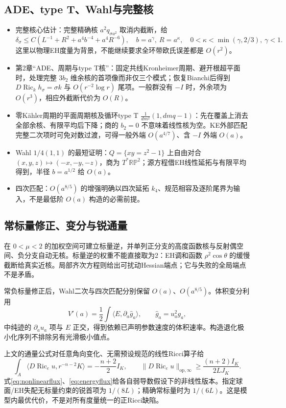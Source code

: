 \documentclass[UTF8,a4paper,11pt,fontset=fandol]{ctexart}
\numberwithin{equation}{section}
\theoremstyle{definition}
\newcommand{\Ric}{\operatorname{Ric}}
\newcommand{\op}{\mathrm{op}}
\begin{document}
\subsection{ADE、type T、Wahl与完整核}
\begin{itemize}
\item 完整核心估计：完整精确核 $a^2q_{\sigma a^2}$ 取消内截断，给
\[
\delta_\sigma\le C(L^{-1}+R^2+a^4b^{-4}+a^4R^{-6}),
\quad b=a^\gamma,\ R=a^\kappa,
\quad0<\kappa<\min(\gamma,2/3),\ \gamma<1.
\]
这里以物理EH度量为背景，不能继续要求全环带欧氏误差都是 $O(r^2)$。
\item 第2章“ADE、周期与type T核”：固定共线Kronheimer周期、避开根超平面时，处理完整 $3b_2$ 维余核的首项像而非仅三个模式；恢复Bianchi后得到 $D\Ric_kh_\sigma=\sigma k$ 与 $O(r^{-2}\log r)$ 尾项。一般群没有 $-I$ 时，外余项为 $O(r^3)$，相应外截断代价为 $O(R)$。
\item 零K\"ahler周期的平面周期核及循环type T
$\frac1{dm^2}(1,dmq-1)$：先在覆盖上消去全部余核、有限平均后下降；商的 $b_2=0$ 不意味着线性核为空。KE外部匹配完整二次项时可免对数过渡，可得一般外端 $O(a^{4/7})$、含 $-I$ 外端 $O(a)$。
\item Wahl $1/4(1,1)$ 的最短证明：$Q=\{xy=z^2-1\}$ 上自由对合 $(x,y,z)\mapsto(-x,-y,-z)$，商为 $T^*\mathbb{RP}^2$；源方程借EH线性延拓与有限平均得到，半径 $b=a^{1/2}$ 给 $O(a)$。
\item 四次匹配：$O(a^{8/5})$ 的增强明确以四次延拓 $k_4$、规范相容及逐阶尾界为输入，不是最低阶 $O(a)$ 构造的必需前提。
\end{itemize}

\subsection{常标量修正、变分与锐通量}
在 $0<\mu<2$ 的加权空间可建立标量逆，并单列正分支的高度函数核与反射偶空间、负分支自动无核。标量逆的权重不能直接取为2：EH调和函数 $\rho^2\cos\theta$ 的缓慢截断给真实近核。局部齐次方程则给出可扰动Hessian端点；它与失败的全局端点不是矛盾。

常负标量修正后，Wahl二次与四次匹配分别保留 $O(a)$、$O(a^{8/5})$。体积变分利用
\[
V'(a)=\frac12\int\langle E,\partial_a\widehat g_a\rangle,
\qquad \widehat g_a=u_a^2g_a,
\]
中纯迹的 $\partial_a u_a$ 项与 $E$ 正交，得到依赖已声明参数速度的体积速率。构造退化极小化序列不排除另有光滑极小值点。

上文的通量公式对任意角向变化、无需预设规范的线性Ricci算子给
\[
\int_A\langle D\Ric_eu,r^{-n-2}K\rangle
=-\frac{n+2}{2}I_K,
\qquad
\|D\Ric_eu\|_{\op,\infty}\ge\frac{(n+2)I_K}{2LJ_K}.
\]
式\eqref{eq:nonlinearflux}、\eqref{eq:energyflux}给各自弱导数假设下的非线性版本。指定球面/EH失配无标量约束的锐首项为 $1/(8L)$；精确常标量时为 $1/(6L)$。这是模型内最优代价，不是对所有度量统一的正Ricci缺陷。
\end{document}
